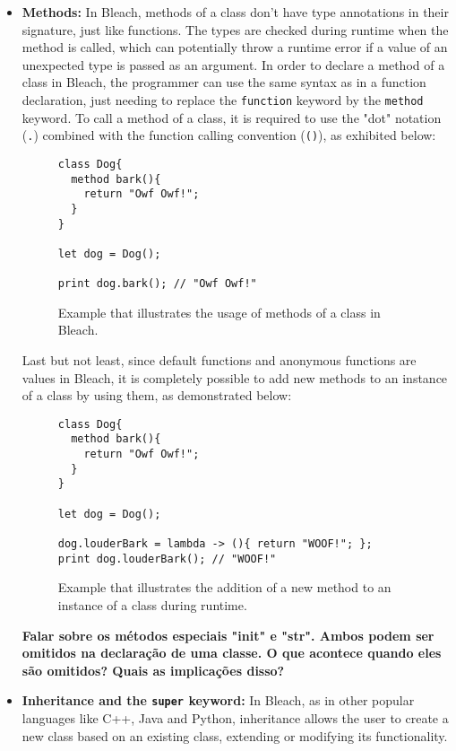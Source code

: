 \begin{itemize}
    \item \textbf{Methods:} In Bleach, methods of a class don't have type annotations in their signature, just like functions. The types are checked during runtime when the method is called, which can potentially throw a runtime error if a value of an unexpected type is passed as an argument. In order to declare a method of a class in Bleach, the programmer can use the same syntax as in a function declaration, just needing to replace the \texttt{function} keyword by the \texttt{method} keyword. To call a method of a class, it is required to use the "dot" notation (\texttt{.}) combined with the function calling convention (\texttt{()}), as exhibited below:
\begin{figure}[H]
    \centering
    \begin{lstlisting}
class Dog{
  method bark(){
    return "Owf Owf!";
  }
}

let dog = Dog();

print dog.bark(); // "Owf Owf!"
    \end{lstlisting}
    \caption{Example that illustrates the usage of methods of a class in Bleach.}
\end{figure}

    Last but not least, since default functions and anonymous functions are values in Bleach, it is completely possible to add new methods to an instance of a class by using them, as demonstrated below:
\begin{figure}[H]
    \centering
    \begin{lstlisting}
class Dog{
  method bark(){
    return "Owf Owf!";
  }
}

let dog = Dog();

dog.louderBark = lambda -> (){ return "WOOF!"; };
print dog.louderBark(); // "WOOF!"
    \end{lstlisting}
    \caption{Example that illustrates the addition of a new method to an instance of a class during runtime.}
\end{figure}
    
    \textbf{Falar sobre os métodos especiais "init" e "str". Ambos podem ser omitidos na declaração de uma classe. O que acontece quando eles são omitidos? Quais as implicações disso?}

    \item \textbf{Inheritance and the \texttt{super} keyword:} In Bleach, as in other popular languages like C++, Java and Python, inheritance allows the user to create a new class based on an existing class, extending or modifying its functionality.


\end{itemize}
